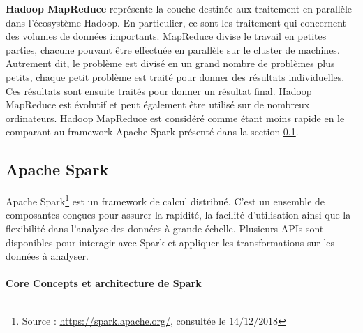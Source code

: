 \textbf{Hadoop MapReduce}  représente la couche destinée aux traitement en parallèle  dans l'écosystème Hadoop. En particulier, ce sont les traitement qui concernent des volumes de données importants.
MapReduce divise le travail en petites parties, chacune pouvant être effectuée en parallèle sur le cluster de machines. Autrement dit, le  problème est divisé en un grand nombre de problèmes plus petits, chaque petit problème est traité pour donner des résultats individuelles. Ces résultats sont ensuite traités pour donner un résultat final. Hadoop MapReduce est évolutif et peut également être utilisé sur de nombreux ordinateurs. Hadoop MapReduce est considéré comme étant moins rapide en le comparant au framework Apache Spark présenté dans la section \ref{apache-spark}.









\subsection{Apache Spark } \label{apache-spark}


Apache Spark\footnote{Source : \url{https://spark.apache.org/}, consultée le $14/12/2018$} 
est un framework de calcul distribué. C'est un ensemble de composantes conçues pour assurer la rapidité, la facilité d'utilisation ainsi que la flexibilité dans l'analyse des données à grande échelle. Plusieurs APIs sont disponibles pour interagir avec Spark et 
 appliquer les transformations sur les données à analyser. 

\paragraph{Core Concepts et architecture de Spark}

